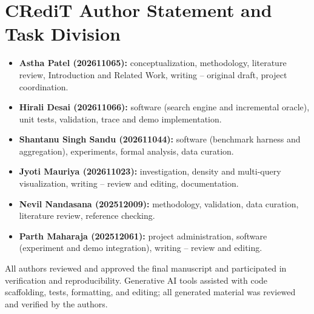 \documentclass[conference]{IEEEtran}
\begin{document}
\section*{CRediT Author Statement and Task Division}
\begin{itemize}
\item \textbf{Astha Patel (202611065):} conceptualization, methodology, literature review, Introduction and Related Work, writing -- original draft, project coordination.
\item \textbf{Hirali Desai (202611066):} software (search engine and incremental oracle), unit tests, validation, trace and demo implementation.
\item \textbf{Shantanu Singh Sandu (202611044):} software (benchmark harness and aggregation), experiments, formal analysis, data curation.
\item \textbf{Jyoti Mauriya (202611023):} investigation, density and multi-query visualization, writing -- review and editing, documentation.
\item \textbf{Nevil Nandasana (202512009):} methodology, validation, data curation, literature review, reference checking.
\item \textbf{Parth Maharaja (202512061):} project administration, software (experiment and demo integration), writing -- review and editing.
\end{itemize}
All authors reviewed and approved the final manuscript and participated in verification and reproducibility. Generative AI tools assisted with code scaffolding, tests, formatting, and editing; all generated material was reviewed and verified by the authors.

\balance
\end{document}
